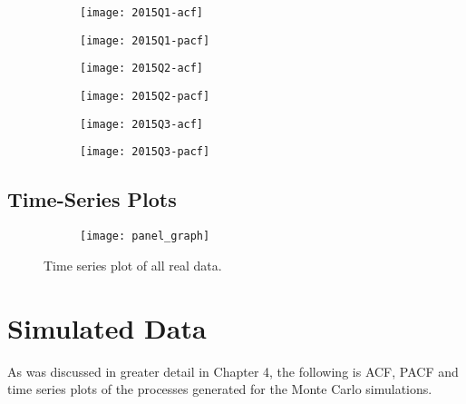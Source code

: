 \begin{figure}[htp]
	\centering
	\begin{subfigure}{0.23\textwidth}
		\centering
		\texttt{[image: 2015Q1-acf]}
	\end{subfigure}
	\begin{subfigure}{0.23\textwidth}
		\centering
		\texttt{[image: 2015Q1-pacf]}
	\end{subfigure}
	\begin{subfigure}{0.23\textwidth}
		\centering
		\texttt{[image: 2015Q2-acf]}
	\end{subfigure}
	\begin{subfigure}{0.23\textwidth}
		\centering
		\texttt{[image: 2015Q2-pacf]}
	\end{subfigure}
\end{figure}

\begin{figure}[htp]
	\centering
	\begin{subfigure}{0.23\textwidth}
		\centering
		\texttt{[image: 2015Q3-acf]}
	\end{subfigure}
	\begin{subfigure}{0.23\textwidth}
		\centering
		\texttt{[image: 2015Q3-pacf]}
	\end{subfigure}
\end{figure}

\pagebreak


\subsection{Time-Series Plots}

\begin{figure}[htp]
	\centering
	\begin{subfigure}{0.75\textwidth}
		\centering
		\texttt{[image: panel\_graph]}
	\end{subfigure}
	\caption{Time series plot of all real data.}
\end{figure}

\section{Simulated Data}

As was discussed in greater detail in Chapter 4, the following is ACF, PACF and time series plots of the processes generated for the Monte Carlo simulations.


